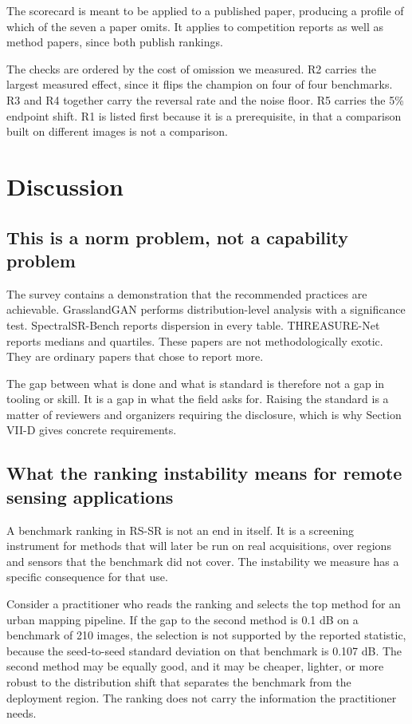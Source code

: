 \documentclass[journal,twoside,10pt]{IEEEtran}
\begin{document}
The scorecard is meant to be applied to a published paper, producing a profile of which of the seven a paper omits. It applies to competition reports as well as method papers, since both publish rankings.

The checks are ordered by the cost of omission we measured. R2 carries the largest measured effect, since it flips the champion on four of four benchmarks. R3 and R4 together carry the reversal rate and the noise floor. R5 carries the 5\% endpoint shift. R1 is listed first because it is a prerequisite, in that a comparison built on different images is not a comparison.

\section{Discussion}


\subsection{This is a norm problem, not a capability problem}


The survey contains a demonstration that the recommended practices are achievable. GrasslandGAN performs distribution-level analysis with a significance test. SpectralSR-Bench reports dispersion in every table. THREASURE-Net reports medians and quartiles. These papers are not methodologically exotic. They are ordinary papers that chose to report more.

The gap between what is done and what is standard is therefore not a gap in tooling or skill. It is a gap in what the field asks for. Raising the standard is a matter of reviewers and organizers requiring the disclosure, which is why Section VII-D gives concrete requirements.

\subsection{What the ranking instability means for remote sensing applications}


A benchmark ranking in RS-SR is not an end in itself. It is a screening instrument for methods that will later be run on real acquisitions, over regions and sensors that the benchmark did not cover. The instability we measure has a specific consequence for that use.

Consider a practitioner who reads the ranking and selects the top method for an urban mapping pipeline. If the gap to the second method is 0.1 dB on a benchmark of 210 images, the selection is not supported by the reported statistic, because the seed-to-seed standard deviation on that benchmark is 0.107 dB. The second method may be equally good, and it may be cheaper, lighter, or more robust to the distribution shift that separates the benchmark from the deployment region. The ranking does not carry the information the practitioner needs.
\end{document}
